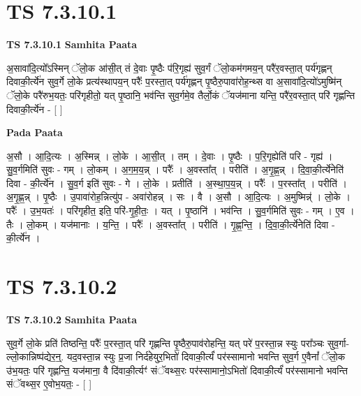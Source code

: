 \documentclass[17pt]{extarticle}
\begin{document}

\section{ TS 7.3.10.1 }

\textbf{TS 7.3.10.1 } \newline
\textbf{Samhita Paata} \newline

अ॒सावा॑दि॒त्यो᳚ऽस्मिन् ॅलो॒क आ॑सी॒त् तं दे॒वाः पृ॒ष्ठैः प॑रि॒गृह्य॑ सुव॒र्गं ॅलो॒कम॑गमय॒न् परै॑र॒वस्ता॒त् पर्य॑गृह्णन् दिवाकी॒र्त्ये॑न सुव॒र्गे लो॒के प्रत्य॑स्थापय॒न् परैः᳚ प॒रस्ता॒त् पर्य॑गृह्णन् पृ॒ष्ठैरु॒पावा॑रोह॒न्थ्स वा अ॒सावा॑दि॒त्यो॑ऽमुष्मि॑न् ॅलो॒के परै॑रुभ॒यतः॒ परि॑गृहीतो॒ यत् पृ॒ष्ठानि॒ भव॑न्ति सुव॒र्गमे॒व तैर्लो॒कं ॅयज॑माना यन्ति॒ परै॑र॒वस्ता॒त् परि॑ गृह्णन्ति दिवाकी॒र्त्ये॑न - [  ] \newline

\textbf{Pada Paata} \newline

अ॒सौ । आ॒दि॒त्यः । अ॒स्मिन्न् । लो॒के । आ॒सी॒त् । तम् । दे॒वाः । पृ॒ष्ठैः । प॒रि॒गृह्येति॑ परि - गृह्य॑ । सु॒व॒र्गमिति॑ सुवः - गम् । लो॒कम् । अ॒ग॒म॒य॒न्न् । परैः᳚ । अ॒वस्ता᳚त् । परीति॑ । अ॒गृ॒ह्ण॒न्न् । दि॒वा॒की॒र्त्ये॑नेति॑ दिवा - की॒र्त्ये॑न । सु॒व॒र्ग इति॑ सुवः - गे । लो॒के । प्रतीति॑ । अ॒स्था॒प॒य॒न्न् । परैः᳚ । प॒रस्ता᳚त् । परीति॑ । अ॒गृ॒ह्ण॒न्न् । पृ॒ष्ठैः । उ॒पावा॑रोह॒न्नित्यु॑प - अवा॑रोहन्न् । सः । वै । अ॒सौ । आ॒दि॒त्यः । अ॒मुष्मिन्न्॑ । लो॒के । परैः᳚ । उ॒भ॒यतः॑ । परि॑गृहीत॒ इति॒ परि॑-गृ॒ही॒तः॒ । यत् । पृ॒ष्ठानि॑ । भव॑न्ति । सु॒व॒र्गमिति॑ सुवः - गम् । ए॒व । तैः । लो॒कम् । यज॑मानाः । य॒न्ति॒ । परैः᳚ । अ॒वस्ता᳚त् । परीति॑ । गृ॒ह्ण॒न्ति॒ । दि॒वा॒की॒र्त्ये॑नेति॑ दिवा - की॒र्त्ये॑न ।  \newline





\section{ TS 7.3.10.2 }

\textbf{TS 7.3.10.2 } \newline
\textbf{Samhita Paata} \newline

सुव॒र्गे लो॒के प्रति॑ तिष्ठन्ति॒ परैः᳚ प॒रस्ता॒त् परि॑ गृह्णन्ति पृ॒ष्ठैरु॒पाव॑रोहन्ति॒ यत् परे॑ प॒रस्ता॒न्न स्युः परा᳚ञ्चः सुव॒र्गा-ल्लो॒कान्निष्प॑द्येर॒न्॒. यद॒वस्ता॒न्न स्युः प्र॒जा निर्द॑हेयुर॒भितो॑ दिवाकी॒र्त्यं॑ पर॑स्सामानो भवन्ति सुव॒र्ग ए॒वैनां᳚ ॅलो॒क उ॑भ॒यतः॒ परि॑ गृह्णन्ति॒ यज॑माना॒ वै दि॑वाकी॒र्त्यꣳ॑ संॅवथ्स॒रः पर॑स्सामानो॒ऽभितो॑ दिवाकी॒र्त्यं॑ पर॑स्सामानो भवन्ति संॅवथ्स॒र ए॒वोभ॒यतः॒ - [  ] \newline
\end{document}
